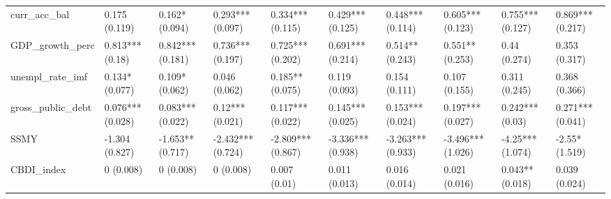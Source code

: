\begin{table}[ht]
\begin{tabular}{llllllllll}
  curr\_acc\_bal & 0.175 (0.119) & 0.162* (0.094) & 0.293*** (0.097) & 0.334*** (0.115) & 0.429*** (0.125) & 0.448*** (0.114) & 0.605*** (0.123) & 0.755*** (0.127) & 0.869*** (0.217) \\ 
  GDP\_growth\_perc & 0.813*** (0.18) & 0.842*** (0.181) & 0.736*** (0.197) & 0.725*** (0.202) & 0.691*** (0.214) & 0.514** (0.243) & 0.551** (0.253) & 0.44 (0.274) & 0.353 (0.317) \\ 
  unempl\_rate\_imf & 0.134* (0.077) & 0.109* (0.062) & 0.046 (0.062) & 0.185** (0.075) & 0.119 (0.093) & 0.154 (0.111) & 0.107 (0.155) & 0.311 (0.245) & 0.368 (0.366) \\ 
  gross\_public\_debt & 0.076*** (0.028) & 0.083*** (0.022) & 0.12*** (0.021) & 0.117*** (0.022) & 0.145*** (0.025) & 0.153*** (0.024) & 0.197*** (0.027) & 0.242*** (0.03) & 0.271*** (0.041) \\ 
  SSMY & -1.304 (0.827) & -1.653** (0.717) & -2.432*** (0.724) & -2.809*** (0.867) & -3.336*** (0.938) & -3.263*** (0.933) & -3.496*** (1.026) & -4.25*** (1.074) & -2.55* (1.519) \\ 
  CBDI\_index & 0 (0.008) & 0 (0.008) & 0 (0.008) & 0.007 (0.01) & 0.011 (0.013) & 0.016 (0.014) & 0.021 (0.016) & 0.043** (0.018) & 0.039 (0.024) \\ 
   \bottomrule
\end{tabular}
\endgroup
\end{table}
